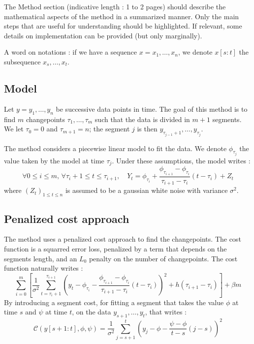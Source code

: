 \documentclass[11pt]{article}
\begin{document}
The Method section (indicative length : 1 to 2 pages) should describe the mathematical aspects of the method in a summarized manner. Only the main steps that are useful for understanding should be highlighted. If relevant, some details on implementation can be provided (but only marginally).

A word on notations : if we have a sequence $x=x_1,\dots,x_n$, we denote $x[s:t]$ the subsequence $x_s,\dots,x_t$.

\subsection{Model}

Let $y=y_1, \dots, y_n$ be successive data points in time. The goal of this method is to find $m$ changepoints $\tau_1,\dots,\tau_m$ such that the data is divided in $m+1$ segments. We let $\tau_0=0$ and $\tau_{m+1}=n$; the segment $j$ is then $y_{\tau_{j-1}+1},\dots,y_{\tau_j}$.

The method considers a piecewise linear model to fit the data. We denote $\phi_{\tau_j}$ the value taken by the model at time $\tau_j$. Under these assumptions, the model writes :
\begin{equation}
    \forall 0\leq i\leq m,\,\forall \tau_i+1\leq t\leq \tau_{i+1},\quad Y_t=\phi_{\tau_i}+\frac{\phi_{\tau_{i+1}}-\phi_{\tau_i}}{\tau_{i+1}-\tau_i}(t-\tau_i)+Z_t
\end{equation}
where $(Z_t)_{1\leq t\leq n}$ is assumed to be a gaussian white noise with variance $\sigma^2$.

\subsection{Penalized cost approach}

The method uses a penalized cost approach to find the changepoints. The cost function is a squarred error loss, penalized by a term that depends on the segments length, and an $L_0$ penalty on the number of changepoints. The cost function naturally writes :
\begin{equation}
    \sum_{i=0}^m \left[\frac{1}{\sigma^2}\sum_{t=\tau_i+1}^{\tau_{i+1}} \left(y_t-\phi_{\tau_i}-\frac{\phi_{\tau_{i+1}}-\phi_{\tau_i}}{\tau_{i+1}-\tau_i}(t-\tau_i)\right)^2 + h(\tau_{i+1}-\tau_i)\right]+\beta m
\end{equation}
By introducing a segment cost, for fitting a segment that takes the value $\phi$ at time $s$ and $\psi$ at time $t$, on the data $y_{s+1},\dots,y_t$, that writes :
\begin{equation}
    \mathcal{C}(y[s+1:t],\phi,\psi) = \frac{1}{\sigma^2}\sum_{j=s+1}^t \left(y_j-\phi-\frac{\psi-\phi}{t-s}(j-s)\right)^2
\end{equation}
\end{document}

